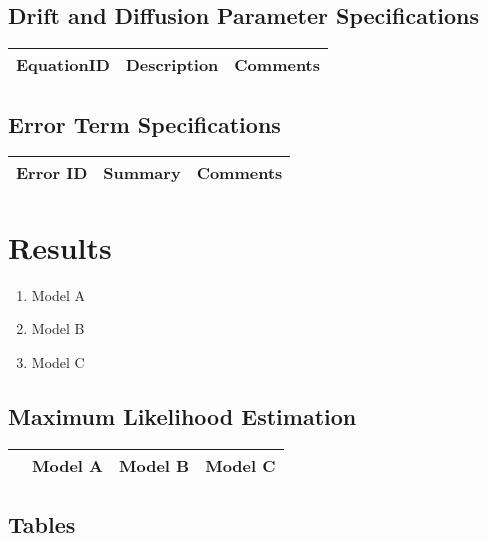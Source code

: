 \subsection{Drift and Diffusion Parameter Specifications}

\begin{table}[H]\centering
	\begin{tabular}{p{1cm}p{4cm}p{3cm}}
		EquationID & Description & Comments\\
		\hline
		\hline
	\end{tabular}
\end{table}

\subsection{Error Term Specifications}

\begin{table}[H]\centering
	\begin{tabular}{p{1cm}p{4cm}p{3cm}}
		Error ID & Summary & Comments\\
		\hline
		\hline
	\end{tabular}
\end{table}

\section{Results}

\begin{enumerate}
	\item Model A
	\item Model B
	\item Model C
\end{enumerate}

\subsection{Maximum Likelihood Estimation}

\begin{table}[H]
	\centering
	\small
	\begin{tabular}{rrrr}
		\hline
		& Model A & Model B & Model C \\ 
		\hline
		\hline
	\end{tabular}
\end{table}

\subsection{Tables}

